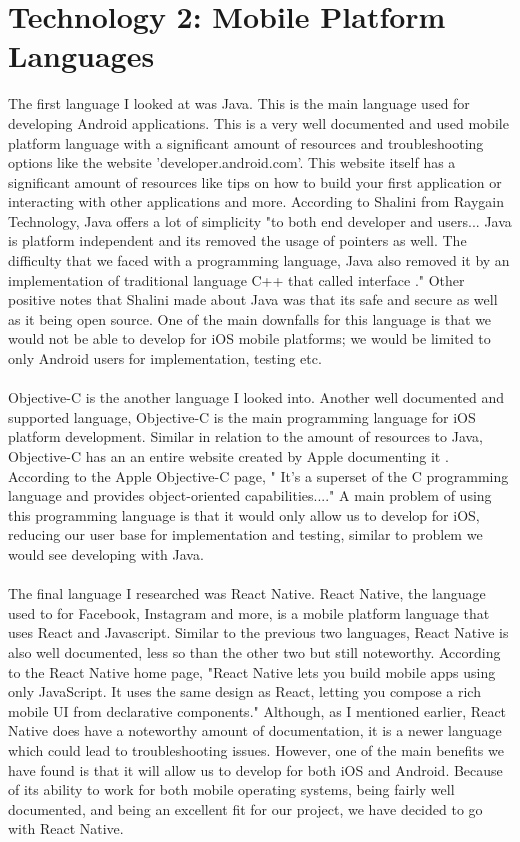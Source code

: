 \documentclass[letterpaper, 10, draftclsnofoot, onecolumn]{IEEEtran}
\begin{document}
\section*{\textbf{Technology 2: Mobile Platform Languages}}
The first language I looked at was Java. This is the main language used for developing Android applications. This is a very well documented and used mobile platform language with a significant amount of resources and troubleshooting options like the website 'developer.android.com'. This website itself has a significant amount of resources like tips on how to build your first application or interacting with other applications and more. According to Shalini from Raygain Technology, Java offers a lot of simplicity "to both end developer and users... Java is platform independent and its removed the usage of pointers as well. The difficulty that we faced with a programming language, Java also removed it by an implementation of traditional language C++ that called interface \cite{r4}." Other positive notes that Shalini made about Java was that its safe and secure as well as it being open source. One of the main downfalls for this language is that we would not be able to develop for iOS mobile platforms; we would be limited to only Android users for implementation, testing etc. 
\\ \\
\indent Objective-C is the another language I looked into. Another well documented and supported language, Objective-C is the main programming language for iOS platform development. Similar in relation to the amount of resources to Java, Objective-C has an an entire website created by Apple documenting it \cite{r5}. According to the Apple Objective-C page, " It’s a superset of the C programming language and provides object-oriented capabilities...\cite{r5}." A main problem of using this programming language is that it would only allow us to develop for iOS, reducing our user base for implementation and testing, similar to problem we would see developing with Java.  
\\ \\
\indent The final language I researched was React Native. React Native, the language used to for Facebook, Instagram and more, is a mobile platform language that uses React and Javascript. Similar to the previous two languages, React Native is also well documented, less so than the other two but still noteworthy. According to the React Native home page, "React Native lets you build mobile apps using only JavaScript. It uses the same design as React, letting you compose a rich mobile UI from declarative components\cite{r6}." Although, as I mentioned earlier, React Native does have a noteworthy amount of documentation, it is a newer language which could lead to troubleshooting issues. However, one of the main benefits we have found is that it will allow us to develop for both iOS and Android. Because of its ability to work for both mobile operating systems, being fairly well documented, and being an excellent fit for our project, we have decided to go with React Native. 
\end{document}
